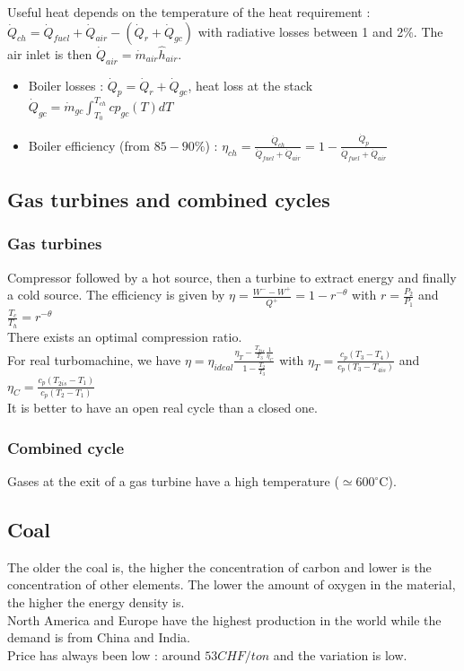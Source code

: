 \documentclass[../main.tex]{subfiles}
\begin{document}
Useful heat depends on the temperature of the heat requirement : $\dot{Q}_{ch} = \dot{Q}_{fuel} + \dot{Q}_{air} - (\dot{Q}_r + \dot{Q}_{gc})$ with radiative losses between 1 and 2$\%$. The air inlet is then $\dot{Q}_{air} = \dot{m}_{air} \hat{h}_{air}$.\\

\begin{itemize}
    \item Boiler losses : $\dot{Q}_p = \dot{Q}_r + \dot{Q}_{gc}$, heat loss at the stack $\dot{Q}_{gc} = \dot{m}_{gc} \int_{T_0}^{T_{ch}} cp_{gc} (T)dT$
    \item Boiler efficiency (from $85-90\%$) : $\eta_{ch} = \frac{\dot{Q}_{ch}}{\dot{Q}_{fuel} + \dot{Q}_{air}} = 1- \frac{\dot{Q}_p}{\dot{Q}_{fuel} + \dot{Q}_{air}}$
\end{itemize}

\subsection{Gas turbines and combined cycles}
\subsubsection{Gas turbines}
Compressor followed by a hot source, then a turbine to extract energy and finally a cold source. The efficiency is given by $\eta = \frac{W^- - W^+}{Q^+} = 1-r^{-\theta}$ with $r = \frac{P_2}{P_1}$ and $\frac{T_c}{T_h} = r^{-\theta}$\\

There exists an optimal compression ratio. \\
For real turbomachine, we have $\eta = \eta_{ideal} \frac{\eta_T - \frac{T_{2is}}{T_3} \frac{1}{\eta_C}}{1-\frac{T_2}{T_3}}$ with $\eta_T = \frac{c_p (T_3-T_4)}{c_p (T_3 - T_{4is})}$ and $\eta_C = \frac{c_p (T_{2is}-T_1)}{c_p (T_2 - T_1)}$\\

It is better to have an open real cycle than a closed one. \\

\subsubsection{Combined cycle}
Gases at the exit of a gas turbine have a high temperature ($\simeq 600^\circ$C). 

\subsection{Coal}
The older the coal is, the higher the concentration of carbon and lower is the concentration of other elements. The lower the amount of oxygen in the material, the higher the energy density is.\\
North America and Europe have the highest production in the world while the demand is from China and India.\\
Price has always been low : around $53 CHF/ton$ and the variation is low.\\
\end{document}
